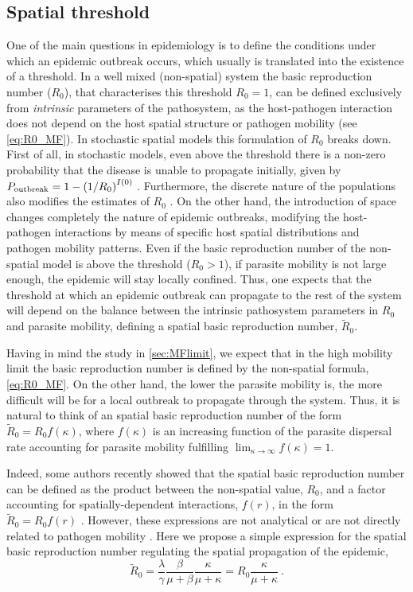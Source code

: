 \subsection{Spatial threshold}

One of the main questions in epidemiology is to define the conditions under
which an epidemic outbreak occurs, which usually is translated into the
existence of a threshold. In a well mixed (non-spatial) system the basic
reproduction number ($R_0$), that characterises this threshold $R_0=1$, can be
defined exclusively from \textit{intrinsic} parameters of the pathosystem, as
the host-pathogen interaction does not depend on the host spatial structure or
pathogen mobility (see \cref{eq:R0_MF}). In stochastic spatial models this
formulation of $R_0$ breaks down. First of all, in stochastic models, even
above the threshold there is a non-zero probability that the disease is unable
to propagate initially, given by
$P_{\textrm{outbreak}}=1-\left(1/R_0\right)^{I(0)}$ \cite{Brauer2008}.
Furthermore, the discrete nature of the populations also modifies the estimates
of $R_0$ \cite{KEELING200051}. On the other hand, the introduction of space
changes completely the nature of epidemic outbreaks, modifying the
host-pathogen interactions by means of specific host spatial distributions and
pathogen mobility patterns. Even if the basic reproduction number of the
non-spatial model is above the threshold ($R_0>1$), if parasite mobility is not
large enough, the epidemic will stay locally confined. Thus, one expects that
the threshold at which an epidemic outbreak can propagate to the rest of the
system will depend on the balance between the intrinsic pathosystem parameters
in $R_0$ and parasite mobility, defining a spatial basic reproduction number,
$\tilde{R}_0$.

Having in mind the study in \cref{sec:MFlimit}, we expect that in the high
mobility limit the basic reproduction number is defined by the non-spatial
formula, \cref{eq:R0_MF}. On the other hand, the lower the parasite mobility
is, the more difficult will be for a local outbreak to propagate through the
system. Thus, it is natural to think of an spatial basic reproduction number of
the form $\tilde{R}_0=R_0 f(\kappa)$, where $f(\kappa)$ is an increasing
function of the parasite dispersal rate accounting for parasite mobility
fulfilling $\lim_{\kappa\to\infty}f(\kappa)=1$.

Indeed, some authors recently showed that the spatial basic reproduction
number can be defined as the product between the non-spatial value, $R_0$, and
a factor accounting for spatially-dependent interactions, $f(r)$, in the form
$\tilde{R}_0=R_0f(r)$ \cite{Filipe2003,Filipe2004,Gilligan2021}. However, these
expressions are not analytical \cite{Filipe2003,Filipe2004} or are not directly
related to pathogen mobility \cite{Gilligan2021}. Here we propose a simple
expression for the spatial basic reproduction number regulating the spatial
propagation of the epidemic,
\begin{equation}\label{eq:R_0ibm}
    \tilde{R}_0=\frac{\lambda}{\gamma}\frac{\beta}{\mu+\beta}
    \frac{\kappa}{\mu+\kappa}=R_0\frac{\kappa}{\mu+\kappa}
    \ .
\end{equation}

